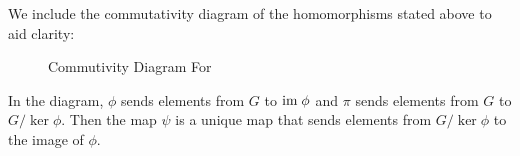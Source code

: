 \newpage

We include the commutativity diagram of the homomorphisms stated above to aid clarity:

\begin{figure}[h]
    \centering
    \caption{Commutivity Diagram For }
\end{figure}

In the diagram, $\phi$ sends elements from $G$ to $\mathrm{im}\;\phi$ and $\pi$ sends elements from $G$ to $G/\ker\phi$. Then the map $\psi$ is a unique map that sends elements from $G/\ker\phi$ to the image of $\phi$.

